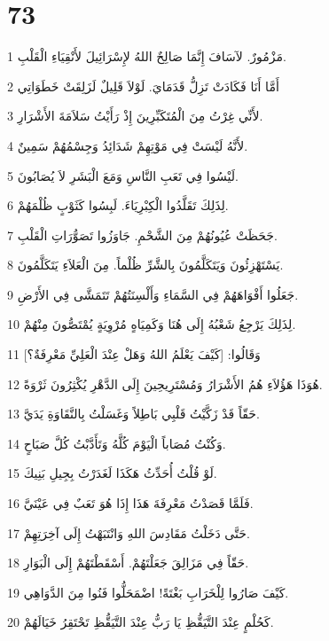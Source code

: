 \chapter{73}

\par 1 مَزْمُورٌ. لآسَافَ إِنَّمَا صَالِحٌ اللهُ لإِسْرَائِيلَ لأَنْقِيَاءِ الْقَلْبِ.
\par 2 أَمَّا أَنَا فَكَادَتْ تَزِلُّ قَدَمَايَ. لَوْلاَ قَلِيلٌ لَزَلِقَتْ خَطَوَاتِي
\par 3 لأَنِّي غِرْتُ مِنَ الْمُتَكَبِّرِينَ إِذْ رَأَيْتُ سَلاَمَةَ الأَشْرَارِ.
\par 4 لأَنَّهُ لَيْسَتْ فِي مَوْتِهِمْ شَدَائِدُ وَجِسْمُهُمْ سَمِينٌ.
\par 5 لَيْسُوا فِي تَعَبِ النَّاسِ وَمَعَ الْبَشَرِ لاَ يُصَابُونَ.
\par 6 لِذَلِكَ تَقَلَّدُوا الْكِبْرِيَاءَ. لَبِسُوا كَثَوْبٍ ظُلْمَهُمْ.
\par 7 جَحَظَتْ عُيُونُهُمْ مِنَ الشَّحْمِ. جَاوَزُوا تَصَوُّرَاتِ الْقَلْبِ.
\par 8 يَسْتَهْزِئُونَ وَيَتَكَلَّمُونَ بِالشَّرِّ ظُلْماً. مِنَ الْعَلاَءِ يَتَكَلَّمُونَ.
\par 9 جَعَلُوا أَفْوَاهَهُمْ فِي السَّمَاءِ وَأَلْسِنَتُهُمْ تَتَمَشَّى فِي الأَرْضِ.
\par 10 لِذَلِكَ يَرْجِعُ شَعْبُهُ إِلَى هُنَا وَكَمِيَاهٍ مُرْوِيَةٍ يُمْتَصُّونَ مِنْهُمْ.
\par 11 وَقَالُوا: [كَيْفَ يَعْلَمُ اللهُ وَهَلْ عِنْدَ الْعَلِيِّ مَعْرِفَةٌ؟]
\par 12 هُوَذَا هَؤُلاَءِ هُمُ الأَشْرَارُ وَمُسْتَرِيحِينَ إِلَى الدَّهْرِ يُكْثِرُونَ ثَرْوَةً.
\par 13 حَقّاً قَدْ زَكَّيْتُ قَلْبِي بَاطِلاً وَغَسَلْتُ بِالنَّقَاوَةِ يَدَيَّ.
\par 14 وَكُنْتُ مُصَاباً الْيَوْمَ كُلَّهُ وَتَأَدَّبْتُ كُلَّ صَبَاحٍ.
\par 15 لَوْ قُلْتُ أُحَدِّثُ هَكَذَا لَغَدَرْتُ بِجِيلِ بَنِيكَ.
\par 16 فَلَمَّا قَصَدْتُ مَعْرِفَةَ هَذَا إِذَا هُوَ تَعَبٌ فِي عَيْنَيَّ.
\par 17 حَتَّى دَخَلْتُ مَقَادِسَ اللهِ وَانْتَبَهْتُ إِلَى آخِرَتِهِمْ.
\par 18 حَقّاً فِي مَزَالِقَ جَعَلْتَهُمْ. أَسْقَطْتَهُمْ إِلَى الْبَوَارِ.
\par 19 كَيْفَ صَارُوا لِلْخَرَابِ بَغْتَةً! اضْمَحَلُّوا فَنُوا مِنَ الدَّوَاهِي.
\par 20 كَحُلْمٍ عِنْدَ التَّيَقُّظِ يَا رَبُّ عِنْدَ التَّيَقُّظِ تَحْتَقِرُ خَيَالَهُمْ.
